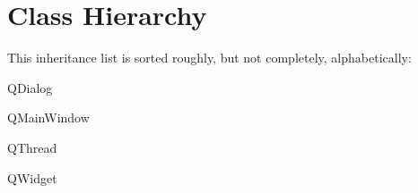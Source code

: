 \section{Class Hierarchy}
This inheritance list is sorted roughly, but not completely, alphabetically\-:\begin{DoxyCompactList}
\item Q\-Dialog\begin{DoxyCompactList}
\item {}
\item {}
\end{DoxyCompactList}
\item Q\-Main\-Window\begin{DoxyCompactList}
\item {}
\end{DoxyCompactList}
\item Q\-Thread\begin{DoxyCompactList}
\item {}
\end{DoxyCompactList}
\item Q\-Widget\begin{DoxyCompactList}
\item {}
\end{DoxyCompactList}
\end{DoxyCompactList}
